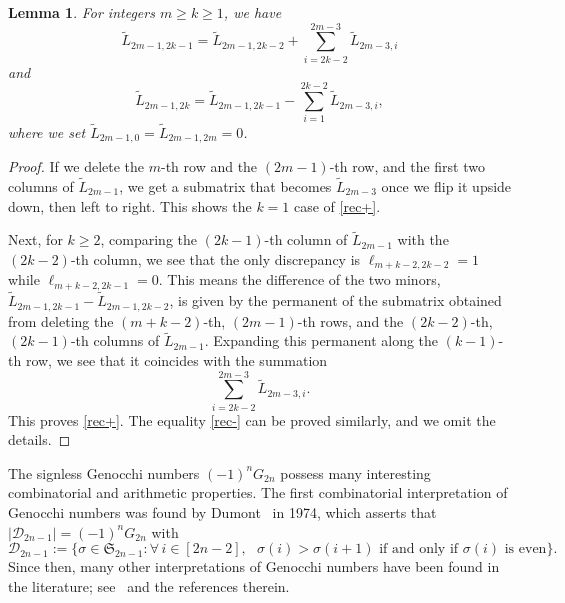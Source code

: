 \documentclass[11pt,reqno]{amsart}
\numberwithin{equation}{section}
\theoremstyle{plain}
\newtheorem{lemma}[theorem]{Lemma}
\theoremstyle{definition}
\renewcommand{\S}{\mathfrak{S}}
\def\gs{\geqslant}
\begin{document}
\begin{lemma}\label{rec:krew}
For integers $m\gs k\gs1$, we have
\begin{equation}
\label{rec+}
\tilde{L}_{2m-1,2k-1} =\tilde{L}_{2m-1,2k-2}+\sum_{i=2k-2}^{2m-3}\tilde{L}_{2m-3,i}
\end{equation}
and
\begin{equation}\label{rec-}
\tilde{L}_{2m-1,2k} =\tilde{L}_{2m-1,2k-1}-\sum_{i=1}^{2k-2}\tilde{L}_{2m-3,i},
\end{equation}
where we set $\tilde{L}_{2m-1,0}=\tilde{L}_{2m-1,2m}=0$.
\end{lemma}
\begin{proof}
If we delete the $m$-th row and the $(2m-1)$-th row, and the first two columns of $\tilde{L}_{2m-1}$, we get a submatrix that becomes $\tilde{L}_{2m-3}$ once we flip it upside down, then left to right. This shows the $k=1$ case of \eqref{rec+}.

Next, for $k\ge 2$, comparing the $(2k-1)$-th column of $\tilde{L}_{2m-1}$ with the $(2k-2)$-th column, we see that the only discrepancy is $\ell_{m+k-2,2k-2}=1$ while $\ell_{m+k-2,2k-1}=0$. This means the difference of the two minors, $\tilde{L}_{2m-1,2k-1} -\tilde{L}_{2m-1,2k-2}$, is given by the permanent of the submatrix obtained from deleting the $(m+k-2)$-th, $(2m-1)$-th rows, and the $(2k-2)$-th, $(2k-1)$-th columns of $\tilde{L}_{2m-1}$. Expanding this permanent along the $(k-1)$-th row, we see that it coincides with the summation
$$\sum_{i=2k-2}^{2m-3}\tilde{L}_{2m-3,i}.$$
This proves \eqref{rec+}. The equality \eqref{rec-} can be proved similarly, and we omit the details.
\end{proof}

The signless Genocchi numbers $(-1)^nG_{2n}$ possess   many interesting combinatorial and arithmetic properties. The first combinatorial interpretation of Genocchi numbers was found by Dumont~\cite{du} in 1974, which asserts that
$|\mathcal{D}_{2n-1}|=(-1)^nG_{2n}$ with
 $$
 \mathcal{D}_{2n-1}:=\{\sigma\in\S_{2n-1}:\forall\, i\in[2n-2], \text{ $\sigma(i)>\sigma(i+1)$ if and only if $\sigma(i)$ is even}\}.
 $$
 Since then, many other interpretations of Genocchi numbers have been found in the literature; see~\cite{Big,Bur,Fei,Han,Kre,LY} and the references therein.
\end{document}

